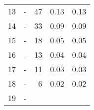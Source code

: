 \begin{longtable}{lXrrr}
     13 &
     \multicolumn{1}{X}{ -  } &


       \num{47} &
       \num[round-mode=places,round-precision=2]{0.13} &
         \num[round-mode=places,round-precision=2]{0.13} \\

     14 &
     \multicolumn{1}{X}{ -  } &


       \num{33} &
       \num[round-mode=places,round-precision=2]{0.09} &
         \num[round-mode=places,round-precision=2]{0.09} \\

     15 &
     \multicolumn{1}{X}{ -  } &


       \num{18} &
       \num[round-mode=places,round-precision=2]{0.05} &
         \num[round-mode=places,round-precision=2]{0.05} \\

     16 &
     \multicolumn{1}{X}{ -  } &


       \num{13} &
       \num[round-mode=places,round-precision=2]{0.04} &
         \num[round-mode=places,round-precision=2]{0.04} \\

     17 &
     \multicolumn{1}{X}{ -  } &


       \num{11} &
       \num[round-mode=places,round-precision=2]{0.03} &
         \num[round-mode=places,round-precision=2]{0.03} \\

     18 &
     \multicolumn{1}{X}{ -  } &


       \num{6} &
       \num[round-mode=places,round-precision=2]{0.02} &
         \num[round-mode=places,round-precision=2]{0.02} \\

     19 &
     \multicolumn{1}{X}{ -  } &



\end{longtable}
